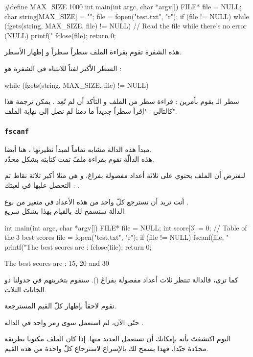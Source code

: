 \begin{Csource}
#define MAX_SIZE 1000
int main(int argc, char *argv[])
{
    FILE* file = NULL;
    char string[MAX_SIZE] = "";
    file = fopen("test.txt", "r");
    if (file != NULL)
    {
        while (fgets(string, MAX_SIZE, file) != NULL) // Read the file while there's no error (NULL)
        {
            printf("%
        }
        fclose(file);
    }
    return 0;
}
\end{Csource}

هذه الشفرة تقوم بقراءة الملف سطراً سطراً و إظهار الأسطر.

السطر الأكثر لفتاً للانتباه في الشفرة هو :

\begin{Csource}
while (fgets(string, MAX_SIZE, file) != NULL)
\end{Csource}

سطر الـ
يقوم بأمرين : قراءة سطر من الملف و التأكد أن
لم تُعِد
.
يمكن ترجمة هذا كالتالي : "إقرأ سطراً جديداً ما دمنا لم نصل إلى نهاية الملف".

\subsubsection{\texttt{fscanf}}
مبدأ هذه الدالة مشابه تماماً لمبدأ نظيرتها
،
هنا أيضا.\\
هذه الدالّة تقوم بقراءة ملفّ تمت كتابته بشكل محدّد.

لنفترض أن الملف يحتوي على ثلاثة أعداد مفصولة بفراغ، و هي مثلا أكبر ثلاثة نقاط تم التحصل عليها في لعبتك :
.

أنت تريد أن تسترجع كلّ واحد من هذه الأعداد في متغير من نوع
.\\
الدالة
ستسمح لك بالقيام بهذا بشكل سريع.

\begin{Csource}
int main(int argc, char *argv[])
{
  FILE* file = NULL;
  int score[3] = {0}; // Table of the 3 best scores
  file = fopen("test.txt", "r");
  if (file != NULL)
  {
    fscanf(file, "%
    printf("The best scores are : %
    fclose(file);
  }
  return 0;
}
\end{Csource}

\begin{Console}
The best scores are : 15, 20 and 30
\end{Console}

كما ترى، فالدالة
تنتظر ثلاث أعداد مفصولة بفراغ
().
ستقوم بتخزينهم في جدولنا ذو الخانات الثلاث.

نقوم لاحقاً بإظهار كلّ القيم المسترجعة.

\begin{information}
حتّى الآن، لم استعمل سوى رمز
واحد في الدالة
.

اليوم اكتشفتَ بأنه بإمكانك أن تستعمل العديد منها. إذا كان الملف مكتوبا بطريقة محدّدة جيّدا، فهذا يسمح لك بالإسراع لاسترجاع كلّ واحدة من هذه القيم.
\end{information}
